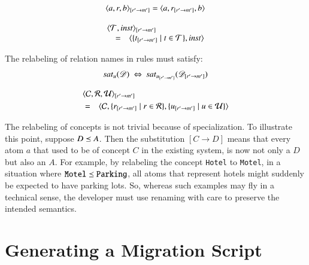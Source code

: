 \documentclass{elsarticle}
\begin{document}
\begin{definition}
   \[\subst{r'}{m'}{\triple{a}{r}{b}} = \triple{a}{\subst{r'}{m'}{r}}{b}\]
\end{definition}
\begin{definition}
   \[\begin{array}{rcl}
      \rlap{$\subst{r'}{m'}{\pair{\triples}{\inst}}$}\\
      &=&\pair{\{\subst{r'}{m'}{t}\mid t\in\triples\}}{\inst}
   \end{array}\]
\end{definition}
   The relabeling of relation names in rules must satisfy:
\begin{equation}
   \sat{u}{\dataset}\ \Leftrightarrow\ \sat{\subst{r'}{m'}{u}}{\subst{r'}{m'}{\dataset}}
\end{equation}
\begin{definition}
   \begin{eqnarray}
      \rlap{$\subst{r'}{m'}{\triple{\concepts}{\rels}{\rules}}$}\notag\\
      &=&\triple{\concepts}{\{\subst{r'}{m'}{r} \mid r\in\rels\}}{\{\subst{r'}{m'}{u} \mid u\in\rules\}}\notag
   \end{eqnarray}
\end{definition}
   
   The relabeling of concepts is not trivial because of specialization.
   To illustrate this point, suppose $D\isa A$.
   Then the substitution $[C\rightarrow D]$ means that every atom $a$ that used to be of concept $C$ in the existing system, is now not only a $D$ but also an $A$.
   For example, by relabeling the concept {\tt Hotel} to {\tt Motel}, in a situation where ${\tt Motel}\isa{\tt Parking}$,
   all atoms that represent hotels might suddenly be expected to have parking lots.
   So, whereas such examples may fly in a technical sense, the developer must use renaming with care to preserve the intended semantics.

\section*{Generating a Migration Script}
\end{document}
